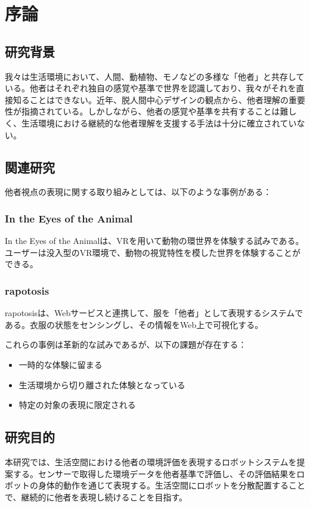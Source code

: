 \documentclass{cuxarticle}
\begin{document}
\begin{titlepage}
  
\end{titlepage}

\tableofcontents

\chapter{序論}

\section{研究背景}
我々は生活環境において、人間、動植物、モノなどの多様な「他者」と共存している。他者はそれぞれ独自の感覚や基準で世界を認識しており、我々がそれを直接知ることはできない。近年、脱人間中心デザインの観点から、他者理解の重要性が指摘されている。しかしながら、他者の感覚や基準を共有することは難しく、生活環境における継続的な他者理解を支援する手法は十分に確立されていない。

\section{関連研究}
他者視点の表現に関する取り組みとしては、以下のような事例がある：

\subsection{In the Eyes of the Animal}
In the Eyes of the Animal\cite{--EyesAnimal}は、VRを用いて動物の環世界を体験する試みである。ユーザーは没入型のVR環境で、動物の視覚特性を模した世界を体験することができる。

\subsection{rapotosis}
rapotosis\cite{--ソンヨン}は、Webサービスと連携して、服を「他者」として表現するシステムである。衣服の状態をセンシングし、その情報をWeb上で可視化する。

これらの事例は革新的な試みであるが、以下の課題が存在する：
\begin{itemize}
  \item 一時的な体験に留まる
  \item 生活環境から切り離された体験となっている
  \item 特定の対象の表現に限定される
\end{itemize}

\section{研究目的}
本研究では、生活空間における他者の環境評価を表現するロボットシステムを提案する。センサーで取得した環境データを他者基準で評価し、その評価結果をロボットの身体的動作を通じて表現する。生活空間にロボットを分散配置することで、継続的に他者を表現し続けることを目指す。
\end{document}
